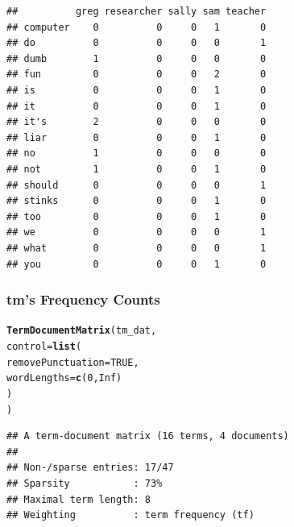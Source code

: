 \documentclass{article}\usepackage[]{graphicx}\usepackage[]{color}
\makeatletter
\newcommand{\hlnum}[1]{\textcolor[rgb]{0.686,0.059,0.569}{#1}}%
\newcommand{\hlstd}[1]{\textcolor[rgb]{0.345,0.345,0.345}{#1}}%
\newcommand{\hlkwc}[1]{\textcolor[rgb]{0.333,0.667,0.333}{#1}}%
\newcommand{\hlkwd}[1]{\textcolor[rgb]{0.737,0.353,0.396}{\textbf{#1}}}%
\newenvironment{kframe}{%
 \def\at@end@of@kframe{}%
 \ifinner\ifhmode%
  \def\at@end@of@kframe{\end{minipage}}%
  \begin{minipage}{\columnwidth}%
 \fi\fi%
 \def\FrameCommand##1{\hskip\@totalleftmargin \hskip-\fboxsep
 \colorbox{shadecolor}{##1}\hskip-\fboxsep
     \hskip-\linewidth \hskip-\@totalleftmargin \hskip\columnwidth}%
 \MakeFramed {\advance\hsize-\width
   \@totalleftmargin\z@ \linewidth\hsize
   \@setminipage}}%
 {\par\unskip\endMakeFramed%
 \at@end@of@kframe}
\newenvironment{knitrout}{}{} %
\makeatother
\begin{document}
\begin{knitrout}
\color{fgcolor}\begin{kframe}
\begin{verbatim}
##          greg researcher sally sam teacher
## computer    0          0     0   1       0
## do          0          0     0   0       1
## dumb        1          0     0   0       0
## fun         0          0     0   2       0
## is          0          0     0   1       0
## it          0          0     0   1       0
## it's        2          0     0   0       0
## liar        0          0     0   1       0
## no          1          0     0   0       0
## not         1          0     0   1       0
## should      0          0     0   0       1
## stinks      0          0     0   1       0
## too         0          0     0   1       0
## we          0          0     0   0       1
## what        0          0     0   0       1
## you         0          0     0   1       0
\end{verbatim}
\end{kframe}
\end{knitrout}



\subsubsection{tm's Frequency Counts}

\begin{knitrout}
\color{fgcolor}\begin{kframe}
\begin{alltt}
\hlkwd{TermDocumentMatrix}\hlstd{(tm_dat,}
    \hlkwc{control} \hlstd{=} \hlkwd{list}\hlstd{(}
        \hlkwc{removePunctuation} \hlstd{=} \hlnum{TRUE}\hlstd{,}
        \hlkwc{wordLengths}\hlstd{=}\hlkwd{c}\hlstd{(}\hlnum{0}\hlstd{,} \hlnum{Inf}\hlstd{)}
    \hlstd{)}
\hlstd{)}
\end{alltt}
\end{kframe}
\end{knitrout}


\begin{knitrout}
\color{fgcolor}\begin{kframe}
\begin{verbatim}
## A term-document matrix (16 terms, 4 documents)
## 
## Non-/sparse entries: 17/47
## Sparsity           : 73%
## Maximal term length: 8 
## Weighting          : term frequency (tf)
\end{verbatim}
\end{kframe}
\end{knitrout}
\end{document}
